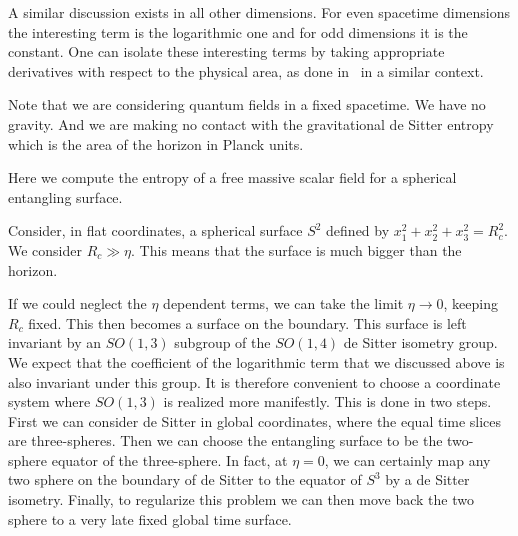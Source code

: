 A similar discussion exists in all other dimensions. For even spacetime dimensions the interesting term
is the logarithmic one and for odd dimensions it is the constant.
One can isolate these interesting terms by taking appropriate derivatives with respect to the physical
area, as done in \LiuEEA\ in a similar context.

Note that we are considering quantum fields in a fixed spacetime. We have no gravity. And we are making
no contact with the gravitational de Sitter entropy which is the area of the horizon in Planck units.



Here we compute the entropy of a free massive scalar field for a spherical entangling surface.



Consider, in flat coordinates, a spherical surface $S^2$ defined by $x_1^2+x_2^2+x_3^2=R_c^2$. We consider $R_c\gg \eta$. This means that the surface is much bigger than the horizon.


\ifig{} {}

If we could neglect the $\eta$ dependent terms, we can take the limit $\eta \to 0$, keeping $R_c$ fixed.
This then becomes a surface on the boundary. This surface is left invariant by an $SO(1,3)$ subgroup
of the $SO(1,4)$ de Sitter isometry group. We expect that the coefficient of the logarithmic term that
we discussed above is also invariant under this group. It is therefore convenient to choose a
coordinate system where $SO(1,3)$ is realized more manifestly. This is done in two steps. First we
can consider de Sitter in global coordinates, where  the equal time slices are three-spheres.
Then we can choose the entangling surface to be the two-sphere equator of the three-sphere.
 In fact, at $\eta=0$, we can certainly map any two sphere on the boundary of de Sitter to the equator
of $S^3$ by a de Sitter isometry. Finally, to regularize this problem we can then move back the two
sphere to a very late fixed global time surface.


